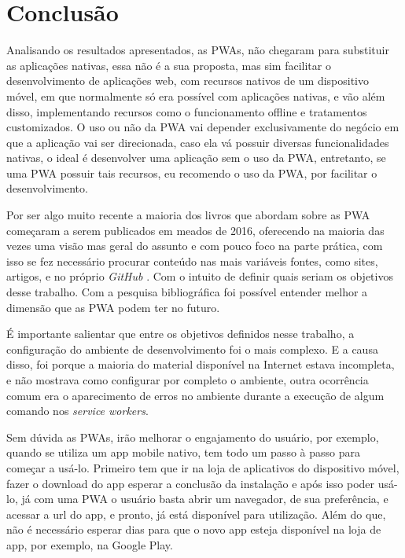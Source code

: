 \chapter{\textbf{Conclusão}}

Analisando os resultados apresentados, as \ac{PWA}s, não chegaram para substituir as aplicações nativas, essa não é a sua proposta, mas sim facilitar o desenvolvimento de aplicações web, com recursos nativos de um dispositivo móvel, em que normalmente só era possível com aplicações nativas, e vão além disso, implementando recursos como o funcionamento offline e tratamentos customizados. O uso ou não da \ac{PWA} vai depender exclusivamente do negócio em que a aplicação vai ser direcionada, caso ela vá possuir diversas funcionalidades nativas, o ideal é desenvolver uma aplicação sem o uso da \ac{PWA}, entretanto, se uma \ac{PWA} possuir tais recursos, eu recomendo o uso da \ac{PWA}, por facilitar o desenvolvimento.

Por ser algo muito recente a maioria dos livros que abordam sobre as \ac{PWA}
começaram a serem publicados em meados de 2016, oferecendo na maioria das vezes uma visão
mas geral do assunto e com pouco foco na parte prática, com isso se fez necessário
procurar conteúdo nas mais variáveis fontes, como sites, artigos, e no próprio \textit{GitHub} . Com o intuito
de definir quais seriam os objetivos desse trabalho. Com a pesquisa bibliográfica foi
possível entender melhor a dimensão que as \ac{PWA} podem ter no futuro.

É importante salientar que entre os objetivos definidos nesse trabalho, a configuração do ambiente de
desenvolvimento foi o mais complexo. E a causa disso, foi porque a maioria do material disponível na Internet estava incompleta, e não mostrava como configurar por completo o
ambiente, outra ocorrência comum era o aparecimento de erros no ambiente durante
a execução de algum comando nos \textit{service workers}.


Sem dúvida as \ac{PWA}s, irão melhorar o engajamento do usuário, por exemplo, quando se utiliza um app mobile nativo, tem todo um passo à passo para começar a usá-lo. Primeiro tem que ir na loja de aplicativos do dispositivo móvel, fazer o download do app esperar a conclusão da instalação e após isso poder usá-lo, já com uma \ac{PWA} o usuário basta abrir um navegador, de sua preferência, e acessar a url do app, e pronto, já está disponível para utilização. Além do que, não é necessário 
esperar dias para que o novo app esteja disponível na loja de app, por exemplo, na Google Play.


